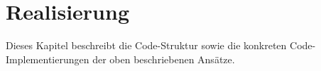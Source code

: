 \chapter{Realisierung}
Dieses Kapitel beschreibt die Code-Struktur sowie die konkreten Code-Implementierungen der oben beschriebenen Ansätze.



\newpage




\newpage

